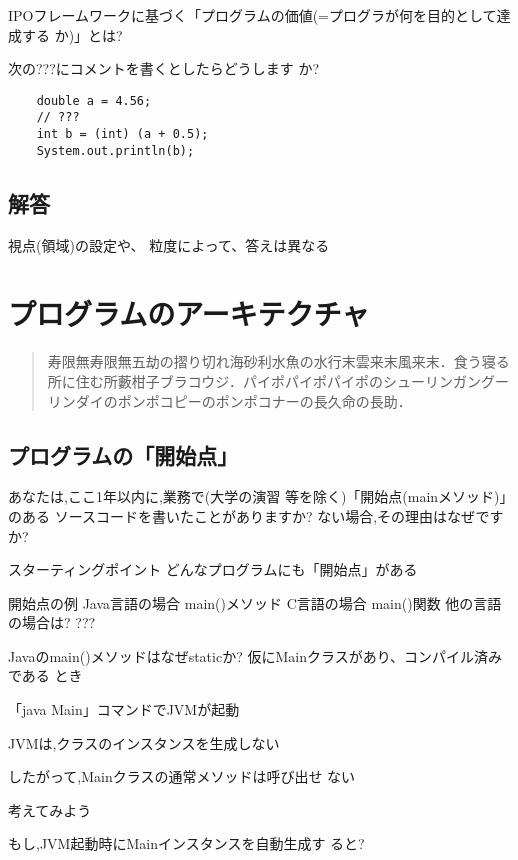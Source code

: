 \documentclass[a4j,papersize]{jsbook}
\begin{document}
\begin{演習}
IPOフレームワークに基づく「プログラムの価値(=プログラが何を目的として達成する
か)」とは?
\end{演習}

\begin{演習}
 次の???にコメントを書くとしたらどうします
か?
\begin{verbatim}
	double a = 4.56;
	// ???
	int b = (int) (a + 0.5);
	System.out.println(b);
\end{verbatim}
\end{演習}
\section{解答}
\begin{解答}
 視点(領域)の設定や、
粒度によって、答えは異なる
\end{解答}

\chapter{プログラムのアーキテクチャ}

\begin{abstract}
寿限無寿限無五劫の摺り切れ海砂利水魚の水行末雲来末風来末．食う寝る所に住む所藪柑子ブラコウジ．パイポパイポパイポのシューリンガングーリンダイのポンポコピーのポンポコナーの長久命の長助．
\end{abstract}

\section{プログラムの「開始点」}
あなたは,ここ1年以内に,業務で(大学の演習
等を除く)「開始点(mainメソッド)」のある
ソースコードを書いたことがありますか?
ない場合,その理由はなぜですか?

スターティングポイント
 どんなプログラムにも「開始点」がある

開始点の例
 Java言語の場合
 main()メソッド
 C言語の場合
 main()関数
 他の言語の場合は?
 ???

Javaのmain()メソッドはなぜstaticか?
仮にMainクラスがあり、コンパイル済みである
とき

 「java Main」コマンドでJVMが起動

 JVMは,クラスのインスタンスを生成しない

 したがって,Mainクラスの通常メソッドは呼び出せ
ない

考えてみよう

 もし,JVM起動時にMainインスタンスを自動生成す
ると?
\end{document}
